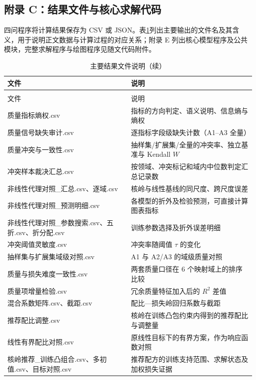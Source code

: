 \subsection*{附录 C：结果文件与核心求解代码}

四问程序将计算结果保存为 CSV 或 JSON。表\ref{tab:appendix2}列出主要输出的文件名及其含义，用于说明正文数据与计算过程的对应关系；附录 E 列出核心模型程序及公共模块，完整求解程序与绘图程序见随文代码附件。

\begin{longtable}{@{}>{\raggedright\arraybackslash}p{}>{\raggedright\arraybackslash}p{}@{}}
  \caption{主要结果文件说明}
  \label{tab:appendix2} \\
  \toprule
  文件 & 说明 \\
  \midrule
  \endfirsthead
  \caption{主要结果文件说明（续）} \\
  \toprule
  文件 & 说明 \\
  \midrule
  \endhead
  \bottomrule
  \endfoot
  质量指标熵权.csv & 22 指标的方向判定、语义说明、信息熵与熵权 \\
  质量信号缺失审计.csv & 逐指标字段级缺失计数（A1--A3 全量） \\
  质量冲突与一致性.csv & 抽样集/扩展集/全量的冲突率、独立基准与 Kendall $W$ \\
  冲突样本裁决汇总.csv & 按领域、冲突标记和域内中位数判定汇总记录数 \\
  非线性代理对照\_\allowbreak{}汇总.csv、逐域.csv & 核岭与线性基线的同尺度、跨尺度误差 \\
  非线性代理对照\_\allowbreak{}预测明细.csv & 各模型的折外及检验预测，可直接计算图表指标 \\
  非线性代理对照\_\allowbreak{}参数搜索.csv、五折.csv、折分配.csv & 训练参数选择及折外误差明细 \\
  冲突阈值灵敏度.csv & 冲突率随阈值 $\tau$ 的变化 \\
  抽样集与扩展集域级对照.csv & A1 与 A2/A3 的域级质量对照 \\
  质量与损失难度一致性.csv & 两套质量口径在 6 个映射域上的排序比较 \\
  质量项增量检验.csv & 冗余质量特征加入后的 $R^2$ 差值 \\
  混合系数矩阵.csv、截距.csv & 配比—损失岭回归系数与截距 \\
  推荐配比调整.csv & 核岭在训练凸包约束内得到的推荐配比与调整量 \\
  线性有界配比对照.csv & 原线性目标下的有界方案，作为响应函数对照 \\
  核岭推荐\_\allowbreak{}训练凸组合.csv、多初值.csv、目标对照.csv & 推荐配方的训练支持范围、求解状态及加权损失证据 \\

\end{longtable}
